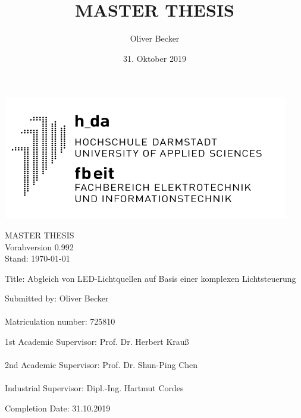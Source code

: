 \documentclass[11pt]{scrartcl}
\title{MASTER THESIS}
\author{Oliver Becker}
\date{31. Oktober 2019} %
\begin{document}
\par\vspace{-1cm}
\begin{flushright}
    \includegraphics[width=0.4\linewidth]{images/logo.png}
\end{flushright}
\vspace{1cm}\noindent
\begin{center}
    \huge MASTER THESIS\\
    \huge \color{red} Vorabversion 0.992\\
    \large Stand: \today
\end{center}
\vspace{1cm}\noindent
{\large Title:  Abgleich von LED-Lichtquellen auf Basis einer komplexen Lichtsteuerung}
\par\vspace{3cm}\noindent
Submitted by: \hspace{2cm}             Oliver Becker\\
\\
Matriculation number:  \hspace{.6cm}   725810\\
\par\vspace{2cm}\noindent
1st Academic Supervisor: \hspace{.2cm} Prof. Dr. Herbert Krauß\\
\\
2nd Academic Supervisor: \hspace{.05cm} Prof. Dr. Shun-Ping Chen\\
\\
Industrial Supervisor:   \hspace{.75cm} Dipl.-Ing. Hartmut Cordes\\
\par\vspace{2cm}\noindent
Completion Date: \hspace{1.5cm}         31.10.2019
\clearpage
\end{document}

